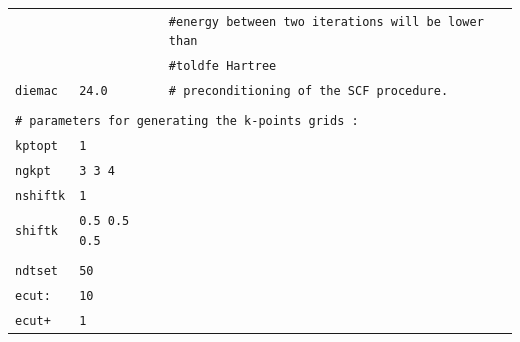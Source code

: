 \documentclass[11pt,a4paper]{article}
\begin{document}
\begin{center}
\begin{tabular}{lll}
&&\texttt{\#\space\space\space\space energy between two iterations will be lower than}\\
&&\texttt{\#\space\space\space\space toldfe Hartree}\\
\texttt{diemac} &\texttt{24.0} & \texttt{\# preconditioning of the SCF procedure.}\\
&&\\
\multicolumn{3}{l}{\texttt{\# parameters for generating the k-points grids : }}\\
\texttt{kptopt} & \texttt{1} &\\
\texttt{ngkpt} & \texttt{3 3 4}&\\
\texttt{nshiftk} &\texttt{1}&\\
\texttt{shiftk} &\texttt{0.5 0.5 0.5}&\\
&&\\
\texttt{ndtset} &\texttt{50}&\\
\texttt{ecut:}&\texttt{10}&\\
\texttt{ecut+}&\texttt{1}&\\ 
\end{tabular}
\end{center} 
\newpage
\end{document}
